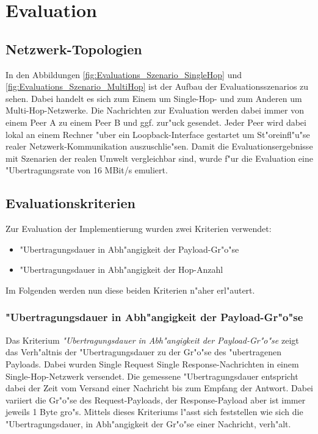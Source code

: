 \chapter{Evaluation}
\label{cha:evaluation}

\section{Netzwerk-Topologien}
In den Abbildungen \ref{fig:Evaluations_Szenario_SingleHop} und \ref{fig:Evaluations_Szenario_MultiHop} ist der Aufbau der Evaluationsszenarios zu sehen. Dabei handelt es sich zum Einem um Single-Hop- und zum Anderen um Multi-Hop-Netzwerke. Die Nachrichten zur Evaluation werden dabei immer von einem Peer A zu einem Peer B und ggf. zur"uck gesendet. Jeder Peer wird dabei lokal an einem Rechner "uber ein Loopback-Interface gestartet um St"oreinfl"u"se realer Netzwerk-Kommunikation auszuschlie"sen. Damit die Evaluationsergebnisse mit Szenarien der realen Umwelt vergleichbar sind, wurde f"ur die Evaluation eine "Ubertragungsrate von 16 MBit/s emuliert.

\section{Evaluationskriterien}
Zur Evaluation der Implementierung wurden zwei Kriterien verwendet:
\begin{itemize}
\item "Ubertragungsdauer in Abh"angigkeit der Payload-Gr"o"se
\item "Ubertragungsdauer in Abh"angigkeit der Hop-Anzahl
\end{itemize}
Im Folgenden werden nun diese beiden Kriterien n"aher erl"autert.

\subsection{"Ubertragungsdauer in Abh"angigkeit der Payload-Gr"o"se}
Das Kriterium \emph{"Ubertragungsdauer in Abh"angigkeit der Payload-Gr"o"se} zeigt das Verh"altnis der "Uber\-tra\-gungs\-dauer zu der Gr"o"se des "ubertragenen Payloads. Dabei wurden Single Request Single Response-Nachrichten in einem Single-Hop-Netzwerk versendet. Die gemessene "Uber\-tra\-gungs\-dauer entspricht dabei der Zeit vom Versand einer Nachricht bis zum Empfang der Antwort. Dabei variiert die Gr"o"se des Request-Payloads, der Response-Payload aber ist immer jeweils 1 Byte gro"s. Mittels dieses Kriteriums l"asst sich feststellen wie sich die "Uber\-tra\-gungs\-dauer, in Abh"angigkeit der Gr"o"se einer Nachricht, verh"alt.

